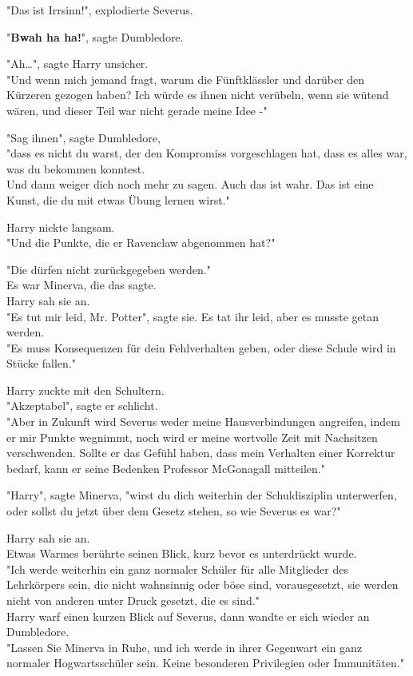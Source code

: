 {"Das ist Irrsinn!", explodierte Severus.

"\textbf{Bwah ha ha!}", sagte Dumbledore.

"Ah…", sagte Harry unsicher.\\ "Und wenn mich jemand fragt, warum die Fünftklässler und darüber den Kürzeren gezogen haben? Ich würde es ihnen nicht verübeln, wenn sie wütend wären, und dieser Teil war nicht gerade meine Idee -"

"Sag ihnen", sagte Dumbledore,\\ "dass es nicht du warst, der den Kompromiss vorgeschlagen hat, dass es alles war, was du bekommen konntest.\\ Und dann weiger dich noch mehr zu sagen. Auch das ist wahr. Das ist eine Kunst, die du mit etwas Übung lernen wirst."

Harry nickte langsam.\\ "Und die Punkte, die er Ravenclaw abgenommen hat?"

"Die dürfen nicht zurückgegeben werden."\\ Es war Minerva, die das sagte.\\ Harry sah sie an.\\ "Es tut mir leid, Mr. Potter", sagte sie. Es tat ihr leid, aber es musste getan werden.\\ "Es muss Konsequenzen für dein Fehlverhalten geben, oder diese Schule wird in Stücke fallen."

Harry zuckte mit den Schultern.\\ "Akzeptabel", sagte er schlicht.\\ "Aber in Zukunft wird Severus weder meine Hausverbindungen angreifen, indem er mir Punkte wegnimmt, noch wird er meine wertvolle Zeit mit Nachsitzen verschwenden. Sollte er das Gefühl haben, dass mein Verhalten einer Korrektur bedarf, kann er seine Bedenken Professor McGonagall mitteilen."

"Harry", sagte Minerva, "wirst du dich weiterhin der Schuldisziplin unterwerfen, oder sollst du jetzt über dem Gesetz stehen, so wie Severus es war?"

Harry sah sie an.\\ Etwas Warmes berührte seinen Blick, kurz bevor es unterdrückt wurde.\\ "Ich werde weiterhin ein ganz normaler Schüler für alle Mitglieder des Lehrkörpers sein, die nicht wahnsinnig oder böse sind, vorausgesetzt, sie werden nicht von anderen unter Druck gesetzt, die es sind."\\ Harry warf einen kurzen Blick auf Severus, dann wandte er sich wieder an Dumbledore.\\ "Lassen Sie Minerva in Ruhe, und ich werde in ihrer Gegenwart ein ganz normaler Hogwartsschüler sein. Keine besonderen Privilegien oder Immunitäten."

}
